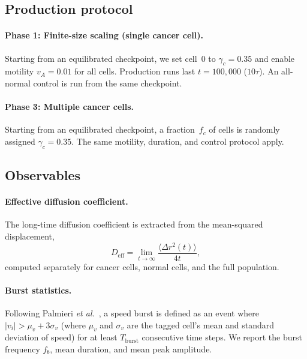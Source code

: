 \documentclass[aps,pre,twocolumn,superscriptaddress,longbibliography,floatfix]{revtex4-2}
\newcommand{\vA}{v_{\!A}}                  %
\newcommand{\Deff}{D_{\mathrm{eff}}}       %
\newcommand{\fc}{f_c}                      %
\begin{document}
\subsection{Production protocol}
\label{sec:methods:production}

\paragraph{Phase 1: Finite-size scaling (single cancer cell).}
%
Starting from an equilibrated checkpoint, we set cell~0 to $\gamma_c
= 0.35$ and enable motility $\vA = 0.01$ for all cells.  Production
runs last $t = 100{,}000$ ($10\tau$).  An all-normal control is run
from the same checkpoint.

\paragraph{Phase 3: Multiple cancer cells.}
%
Starting from an equilibrated checkpoint, a fraction~$\fc$ of cells
is randomly assigned $\gamma_c = 0.35$.  The same motility,
duration, and control protocol apply.

\subsection{Observables}
\label{sec:methods:obs}

\paragraph{Effective diffusion coefficient.}
The long-time diffusion coefficient is extracted from the
mean-squared displacement,
\begin{equation}
  \Deff = \lim_{t\to\infty} \frac{\langle\Delta r^2(t)\rangle}{4t},
  \label{eq:Deff}
\end{equation}
computed separately for cancer cells, normal cells, and the full
population.

\paragraph{Burst statistics.}
Following Palmieri \textit{et al.}~\cite{Palmieri2015}, a speed
burst is defined as an event where $|v_i| > \mu_v + 3\sigma_v$
(where $\mu_v$ and $\sigma_v$ are the tagged cell's mean and standard
deviation of speed) for at least $T_{\mathrm{burst}}$ consecutive
time steps.  We report the burst frequency $f_b$, mean duration, and
mean peak amplitude.
\end{document}

